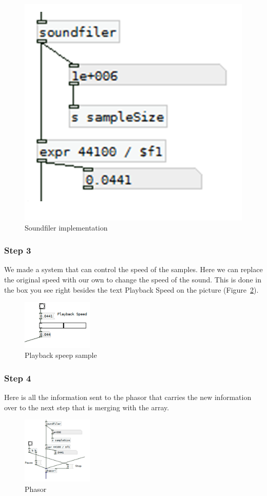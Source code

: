 \begin{figure}[!htbp]
    \centering
    \includegraphics[width=.3\textwidth]{images/Implementation4.png}
    \caption{Soundfiler implementation}
    \label{fig:implementation4}
\end{figure}



\subsubsection*{Step 3} %
\label{ssub:step_3}

We made a system that can control the speed of the samples. 
Here we can replace the original speed with our own to change the speed of the sound. 
This is done in the box you see right besides the text Playback Speed on the picture (Figure~\ref{fig:implementation5}).

\begin{figure}[!htbp]
    \centering
    \includegraphics[width=0.3\textwidth]{images/Implementation5.png}
    \caption{Playback speep sample}
    \label{fig:implementation5}
\end{figure}



\subsubsection*{Step 4} %
\label{ssub:step_4}

Here is all the information sent to the phasor that carries the new information over to the next step that is merging with the array.

\begin{figure}[!htbp]
    \centering
    \includegraphics[width=0.3\textwidth]{images/Implementation6.png}
    \caption{Phasor}
    \label{fig:implementation6}
\end{figure}

